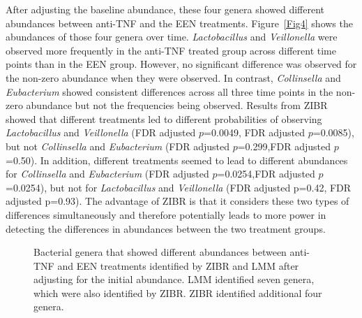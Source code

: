 After adjusting the baseline abundance, these four genera showed different abundances between anti-TNF and the EEN treatments. 
Figure~\ref{Fig4} shows the abundances of those four genera over time.  {\it Lactobacillus} and {\it Veillonella} were observed more frequently  in the anti-TNF treated group across  different time  points than in the EEN group.  However, no significant difference was observed for the  non-zero abundance when they were observed.   
In contrast, {\it Collinsella} and {\it Eubacterium}  showed  consistent differences across  all three time points in the non-zero abundance but not the frequencies being observed.   Results from ZIBR showed that different treatments led to different  probabilities of observing  {\it Lactobacillus} and {\it Veillonella} (FDR adjusted $p$=0.0049, FDR adjusted $p$=0.0085), but  not   {\it  Collinsella} and {\it Eubacterium} (FDR adjusted $p$=0.299,FDR adjusted $p$=0.50).  In addition, different treatments seemed to  lead to different abundances for  {\it Collinsella} and {\it Eubacterium} (FDR adjusted $p$=0.0254,FDR adjusted $p$=0.0254), but not for  {\it Lactobacillus} and {\it  Veillonella} (FDR adjusted p=0.42, FDR adjusted p=0.93). The advantage of ZIBR is that it considers these two types of differences simultaneously and therefore potentially leads to more power in detecting the differences in abundances between the two treatment groups. 


\begin{figure}[!tpb]%
\caption[Bacterial genera that showed  different abundances between anti-TNF and EEN treatments  identified by  ZIBR and LMM]{Bacterial genera that showed  different abundances between anti-TNF and EEN treatments  identified by  ZIBR and LMM after adjusting for the initial abundance.  LMM identified seven genera, which were  also identified by ZIBR. ZIBR  identified additional four genera.}
\label{ZibrVenn}
\end{figure}



